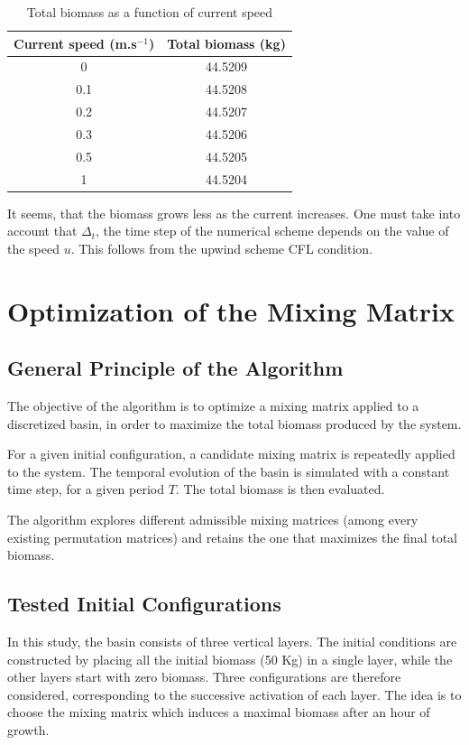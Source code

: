 \documentclass{article}
\begin{document}
\begin{table}[h!]
\centering
\begin{tabular}{|c|c|}
\hline
\textbf{Current speed (m.s$^{-1}$)} & \textbf{Total biomass (kg)} \\
\hline
0   & 44.5209 \\
0.1 & 44.5208 \\
0.2 & 44.5207 \\
0.3 & 44.5206 \\
0.5 & 44.5205 \\
1   & 44.5204 \\
\hline
\end{tabular}
\caption{Total biomass as a function of current speed}
\label{tab:biomass_speed}
\end{table}

It seems, that the biomass grows less as the current increases. One must take into account that $\Delta_t$, the time step of the numerical scheme depends on the value of the speed $u$. 
This follows from the upwind scheme CFL condition. 


\section{Optimization of the Mixing Matrix}

\subsection{General Principle of the Algorithm}

The objective of the algorithm is to optimize a mixing matrix applied to a discretized basin,
in order to maximize the total biomass produced by the system.

For a given initial configuration, a candidate mixing matrix is repeatedly applied to the system.
The temporal evolution of the basin is simulated with a constant time step, for a given period $T$.
The total biomass is then evaluated.

The algorithm explores different admissible mixing matrices (among every existing permutation matrices) and retains the one
that maximizes the final total biomass.

\subsection{Tested Initial Configurations}

In this study, the basin consists of three vertical layers.
The initial conditions are constructed by placing all the initial biomass (50 Kg) in a single layer,
while the other layers start with zero biomass. 
Three configurations are therefore considered, corresponding to the successive activation of each layer. The idea is to choose the mixing matrix which induces a maximal biomass after an hour of growth.
\end{document}

